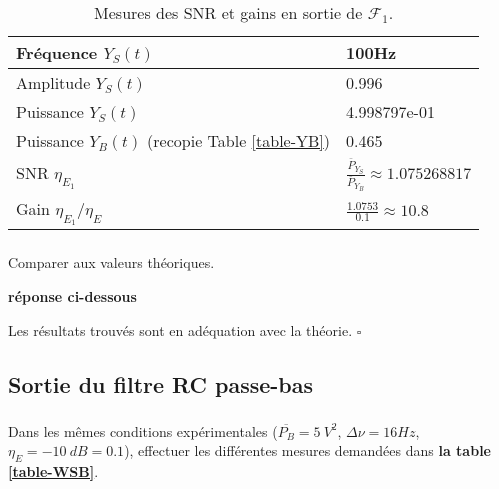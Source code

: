 \documentclass{article}
\newcommand{\dnu}{16}
\newcommand{\debutrep}[1]{\color{blue}\begin{center} \hrulefill \textbf{ #1 } \hrulefill \end{center} }
\newcommand{\finrep}{\vspace*{5mm}\hfill $\square$\color{black}\vspace*{5mm}}
\begin{document}
\begin{table}[H]
\begin{center}
\begin{tabular}{| L{40mm} | C{40mm}|}\hline
Fréquence $Y_{S}(t)$ 		& 100Hz 	\\[5mm] \hline
Amplitude $Y_{S}(t)$ 		& 0.996	\\[5mm] \hline
Puissance  $Y_{S}(t)$ 		& 4.998797e-01	\\[5mm] \hline
Puissance  $Y_{B}(t)$  \newline
(recopie Table \ref{table-YB}) &  0.465	\\[5mm] \hline
SNR $\eta_{E_1}$ 
& $\frac{\overline{P}_Y_S} {\overline{P}_Y_B}\approx 1.075268817$	
\\[5mm] \hline
Gain $\eta_{E_1}/\eta_E$ 	
& 	$\frac{1.0753}{0.1} \approx 10.8$
\\[5mm] \hline
\end{tabular}
\end{center}
\caption{Mesures des SNR et gains en sortie de $\mathcal{F}_1$.}
\label{table-YSB}
\end{table}

\subsubsection{}

Comparer aux valeurs théoriques.

\debutrep{réponse ci-dessous}
Les résultats trouvés sont en adéquation avec la théorie.
\finrep

\subsection{Sortie du filtre RC passe-bas}

\subsubsection{}

Dans les mêmes conditions expérimentales  ($\overline{P_B} = 5~V^2$,  $\Delta\nu = \dnu Hz$, $\eta_E=-10~dB=0.1$), effectuer les différentes mesures demandées dans \textbf{la table \ref{table-WSB}}. 
\end{document}
